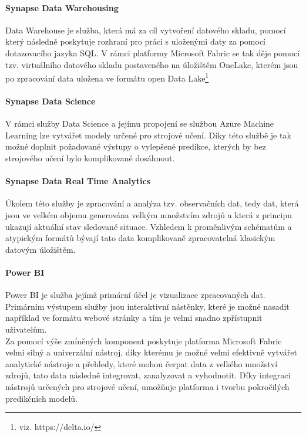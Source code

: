 \documentclass[
  digital,     %
  twoside,     %
  lof,         %
  lot,         %
]{fithesis4}
\begin{document}
\paragraph{Synapse Data Warehousing}
Data Warehouse je služba, která má za cíl vytvoření datového skladu, pomocí který následně poskytuje rozhraní pro práci s uloženými daty za pomocí dotazovacího jazyka SQL. V rámci platformy Microsoft Fabric se tak děje pomocí tzv. virtuálního datového skladu postaveného na úložištěm OneLake, kterém jsou po zpracování data uložena ve formátu open Data Lake\footnote{viz. https://delta.io/} \parencite{DataWarehousing}

\paragraph{Synapse Data Science}
V rámci služby Data Science a jejímu propojení se službou Azure Machine Learning lze vytvářet modely určené pro strojové učení. Díky této službě je tak možné doplnit požadované výstupy o vylepšené predikce, kterých by bez strojového učení bylo komplikované dosáhnout.\parencite{DataScience}

\paragraph{Synapse Data Real Time Analytics}
Úkolem této služby je zpracování a analýza tzv. observačních dat, tedy dat, která jsou ve velkém objemu generována velkým množstvím zdrojů a která z principu ukazují aktuální stav sledované situace. Vzhledem k proměnlivým schématům a atypickým formátů bývají tato data komplikovaně zpracovatelná klasickým datovým úložištěm.\parencite{RealTimeAnalytics}

\paragraph{Power BI}
Power BI je služba jejímž primární účel je vizualizace zpracovaných dat. Primárním výstupem služby jsou interaktivní nástěnky, které je možné nasadit například ve formátu webové stránky a tím je velmi snadno zpřístupnit uživatelům.\parencite{PowerBi}\\

Za pomocí výše zmíněných komponent poskytuje platforma Microsoft Fabric velmi silný a univerzální nástroj, díky kterému je možné velmi efektivně vytvářet analytické nástroje a přehledy, které mohou čerpat data z velkého množství zdrojů, tato data následně integrovat, zanalyzovat a vyhodnotit. Díky integraci nástrojů určených pro strojové učení, umožňuje platforma i tvorbu pokročilých predikčních modelů.
\end{document}

